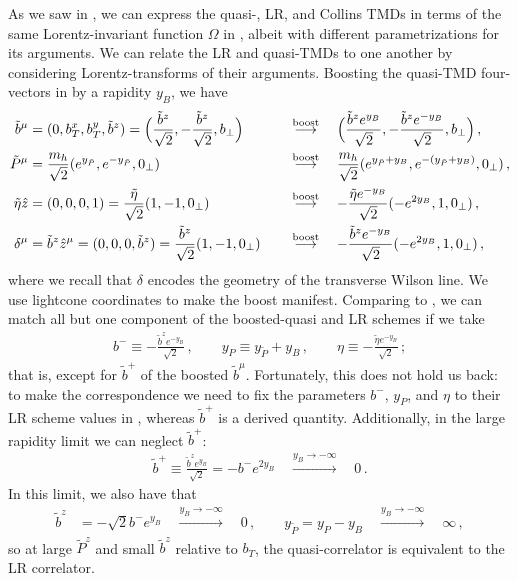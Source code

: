\documentclass[11pt,a4paper]{article}
\newcommand{\nn}{\nonumber}
\newcommand{\Corr}{\Omega}
\begin{document}
As we saw in , we can express the quasi-, LR, and Collins TMDs in terms of the same Lorentz-invariant function $\Corr$ in , albeit with different parametrizations for its arguments.
We can relate the LR and quasi-TMDs to one another by considering Lorentz-transforms of their arguments. 
Boosting the quasi-TMD four-vectors in  by a rapidity $y_B$, we have
\begin{alignat}{2} \label{eq:boosted_params}
\tilde b^\mu &
 = (0, b_T^x, b_T^y, \tilde b^z)
 = \Bigl(\frac{\tilde b^z}{\sqrt 2}, -\frac{\tilde b^z}{\sqrt 2}, b_\perp\Bigr)
 &&\quad\stackrel{\rm boost}{\longrightarrow}\quad
 \Bigl( \frac{\tilde b^z e^{y_B}}{\sqrt 2}, -\frac{\tilde b^z e^{-y_B}}{\sqrt 2}, b_\perp \Bigr)
\,,\nn\\
\tilde P^\mu &= \frac{m_h}{\sqrt 2} (e^{ y_{\tilde P}}, e^{- y_{\tilde P}}, 0_\perp)
 &&\quad\stackrel{\rm boost}{\longrightarrow}\quad
 \frac{m_h}{\sqrt 2} (e^{ y_{\tilde P}+y_B}, e^{-( y_{\tilde P}+y_B)}, 0_\perp)
\,,\nn\\
 \tilde\eta \hat z &
 = (0,0,0,1) = \frac{\tilde\eta}{\sqrt 2} (1, -1, 0_\perp)
 &&\quad\stackrel{\rm boost}{\longrightarrow}\quad
 -\frac{\tilde\eta e^{-y_B}}{\sqrt 2} (-e^{2y_B}, 1, 0_\perp)
\,,\nn\\
\delta^\mu &= \tilde b^z \hat z^\mu
 = (0,0,0,\tilde b^z) = \frac{\tilde b^z}{\sqrt 2} (1, -1, 0_\perp)
 &&\quad\stackrel{\rm boost}{\longrightarrow}\quad
 -\frac{\tilde b^z e^{-y_B}}{\sqrt 2} (-e^{2y_B}, 1, 0_\perp)
\,,\end{alignat}
where we recall that $\delta$ encodes the geometry of the transverse Wilson line.
We use lightcone coordinates to make the boost manifest.
%
Comparing  to , we can match all but one component of the boosted-quasi and LR schemes if we take
\begin{align} \label{eq:param_identities}
 b^- \equiv -\frac{\tilde b^z e^{-y_B}}{\sqrt 2}
 \,,\qquad y_P \equiv  y_{\tilde P} + y_B
 \,,\qquad \eta \equiv - \frac{\tilde\eta e^{-y_B}}{\sqrt 2}
\,;\end{align}
that is, except for $\tilde b^+$ of the boosted $\tilde b^\mu$.
Fortunately, this does not hold us back: to make the correspondence we need to fix the parameters
$b^-$, $y_P$, and $\eta$ to their LR scheme values in ,
whereas $\tilde b^+$ is a derived quantity. 
Additionally, in the large rapidity limit we can neglect $\tilde b^+$:
\begin{align}
 \tilde b^+ \equiv \frac{\tilde b^z e^{y_B}}{\sqrt 2} = - b^- e^{2 y_B}
 \quad\stackrel{y_B \to -\infty}{\longrightarrow}\quad 0
\,.\end{align}
In this limit, we also have that
\begin{align}
 \tilde b^z &= - \sqrt{2} b^- e^{y_B}
 \quad\stackrel{y_B \to -\infty}{\longrightarrow}\quad 0
\,,\qquad
  y_{\tilde P} =  y_P - y_B
 \quad\stackrel{y_B \to -\infty}{\longrightarrow}\quad \infty
\,,\end{align}
so at large $\tilde P^z$ and small $\tilde b^z$ relative to $b_T$,
the quasi-correlator is equivalent to the LR correlator.
\end{document}
